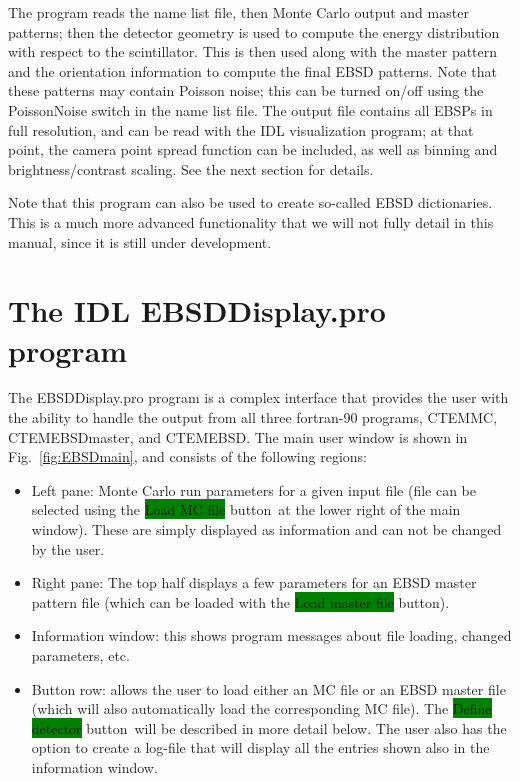 \documentclass[DIV=calc, paper=letter, fontsize=11pt]{scrartcl}	 %
\newcommand{\button}[1]{\colorbox{green}{\textsf{#1}} button}
\begin{document}
The program reads the name list file, then Monte Carlo output and master patterns;  then the detector geometry is used to
compute the energy distribution with respect to the scintillator.  This is then used along with the master pattern and the 
orientation information to compute the final EBSD patterns.  Note that these patterns may contain Poisson noise; this can
be turned on/off using the PoissonNoise switch in the name list file.  The output file contains all EBSPs in full resolution,
and can be read with the IDL visualization program; at that point, the camera point spread function can be included, as well
as binning and brightness/contrast scaling. See the next section for details.

Note that this program can also be used to create so-called EBSD dictionaries.  This is a much more advanced functionality 
that we will not fully detail in this manual, since it is still under development.

\newpage
\section{The IDL \protect\textsf{EBSDDisplay.pro} program\label{sec:idl}}
The \textsf{EBSDDisplay.pro} program is a complex interface that provides the user with the ability to handle the 
output from all three fortran-90 programs, \textsf{CTEMMC}, \textsf{CTEMEBSDmaster}, and \textsf{CTEMEBSD}.  The main
user window is shown in Fig.~\ref{fig:EBSDmain}, and consists of the following regions:
\begin{itemize}
	\item Left pane: Monte Carlo run parameters for a given input file (file can be selected using the \button{Load MC file}\ at the lower right
	of the main window).  These are simply displayed as information and can not be changed by the user.
	\item Right pane: The top half displays a few parameters for an EBSD master pattern file (which can be loaded with the \button{Load master file}).
	\item Information window: this shows program messages about file loading, changed parameters, etc.
	\item Button row: allows the user to load either an MC file or an EBSD master file (which will also automatically load the 
	corresponding MC file).  The \button{Define detector}\ will be described in more detail below.  The user also has the option to 
	create a log-file that will display all the entries shown also in the information window.
\end{itemize}
\end{document}

